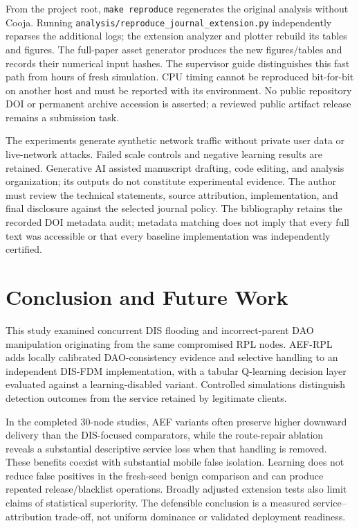 From the project root, \texttt{make reproduce} regenerates the original analysis without Cooja. Running \texttt{analysis/reproduce\_journal\_extension.py} independently reparses the additional logs; the extension analyzer and plotter rebuild its tables and figures. The full-paper asset generator produces the new figures/tables and records their numerical input hashes. The supervisor guide distinguishes this fast path from hours of fresh simulation. CPU timing cannot be reproduced bit-for-bit on another host and must be reported with its environment. No public repository DOI or permanent archive accession is asserted; a reviewed public artifact release remains a submission task.

The experiments generate synthetic network traffic without private user data or live-network attacks. Failed scale controls and negative learning results are retained. Generative AI assisted manuscript drafting, code editing, and analysis organization; its outputs do not constitute experimental evidence. The author must review the technical statements, source attribution, implementation, and final disclosure against the selected journal policy. The bibliography retains the recorded DOI metadata audit; metadata matching does not imply that every full text was accessible or that every baseline implementation was independently certified.

\section{Conclusion and Future Work}\label{sec:conclusion}
This study examined concurrent DIS flooding and incorrect-parent DAO manipulation originating from the same compromised RPL nodes. AEF-RPL adds locally calibrated DAO-consistency evidence and selective handling to an independent DIS-FDM implementation, with a tabular Q-learning decision layer evaluated against a learning-disabled variant. Controlled simulations distinguish detection outcomes from the service retained by legitimate clients.

In the completed 30-node studies, AEF variants often preserve higher downward delivery than the DIS-focused comparators, while the route-repair ablation reveals a substantial descriptive service loss when that handling is removed. These benefits coexist with substantial mobile false isolation. Learning does not reduce false positives in the fresh-seed benign comparison and can produce repeated release/blacklist operations. Broadly adjusted extension tests also limit claims of statistical superiority. The defensible conclusion is a measured service--attribution trade-off, not uniform dominance or validated deployment readiness.

